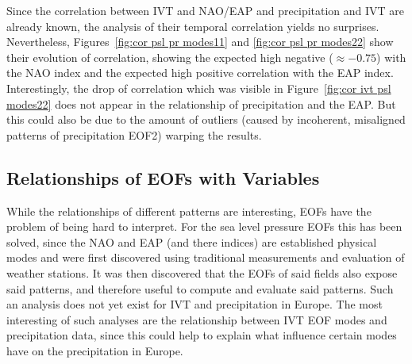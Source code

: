 Since the correlation between IVT and NAO/EAP and precipitation and IVT are already known, the analysis of their temporal correlation yields no surprises. 
Nevertheless, Figures~\ref{fig:cor psl pr modes11} and \ref{fig:cor psl pr modes22} show their evolution of correlation, showing the expected high negative ($\approx -0.75$) with the NAO index and the expected high positive correlation with the EAP index. 
Interestingly, the drop of correlation which was visible in Figure~\ref{fig:cor ivt psl modes22} does not appear in the relationship of precipitation and the EAP. 
But this could also be due to the amount of outliers (caused by incoherent, misaligned patterns of precipitation EOF2) warping the results. 




\subsection{Relationships of EOFs with Variables}

While the relationships of different patterns are interesting, EOFs have the problem of being hard to interpret. 
For the sea level pressure EOFs this has been solved, since the NAO and EAP (and there indices) are established physical modes and were first discovered using traditional measurements and evaluation of weather stations. 
It was then discovered that the EOFs of said fields also expose said patterns, and therefore useful to compute and evaluate said patterns. 
Such an analysis does not yet exist for IVT and precipitation in Europe. 
The most interesting of such analyses are the relationship between IVT EOF modes and precipitation data, since this could help to explain what influence certain modes have on the precipitation in Europe. 


